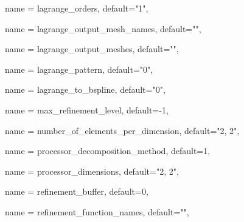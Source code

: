 \begin{parameter}{
    name = {lagrange_orders},
    default={"1"},
    }
\end{parameter}

\begin{parameter}{
    name = {lagrange_output_mesh_names},
    default={""},
    }
\end{parameter}

\begin{parameter}{
    name = {lagrange_output_meshes},
    default={""},
    }
\end{parameter}

\begin{parameter}{
    name = {lagrange_pattern},
    default={"0"},
    }
\end{parameter}

\begin{parameter}{
    name = {lagrange_to_bspline},
    default={"0"},
    }
\end{parameter}

\begin{parameter}{
    name = {max_refinement_level},
    default={-1},
    }
\end{parameter}

\begin{parameter}{
    name = {number_of_elements_per_dimension},
    default={"2, 2"},
    }
\end{parameter}

\begin{parameter}{
    name = {processor_decomposition_method},
    default={1},
    }
\end{parameter}

\begin{parameter}{
    name = {processor_dimensions},
    default={"2, 2"},
    }
\end{parameter}

\begin{parameter}{
    name = {refinement_buffer},
    default={0},
    }
\end{parameter}

\begin{parameter}{
    name = {refinement_function_names},
    default={""},
    }
\end{parameter}

